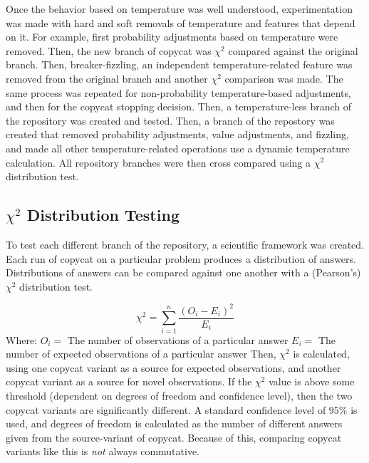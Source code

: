 \documentclass[a4paper]{article}
\begin{document}
        Once the behavior based on temperature was well understood, experimentation was made with hard and soft removals of temperature and features that depend on it.
        For example, first probability adjustments based on temperature were removed.
        Then, the new branch of copycat was $\chi^2$ compared against the original branch.
        Then, breaker-fizzling, an independent temperature-related feature was removed from the original branch and another $\chi^2$ comparison was made.
        The same process was repeated for non-probability temperature-based adjustments, and then for the copycat stopping decision.
        Then, a temperature-less branch of the repository was created and tested.
        Then, a branch of the repostory was created that removed probability adjustments, value adjustments, and fizzling, and made all other temperature-related operations use a dynamic temperature calculation.
        All repository branches were then cross compared using a $\chi^2$ distribution test.

    \subsection{$\chi^2$ Distribution Testing}

        To test each different branch of the repository, a scientific framework was created.
        Each run of copycat on a particular problem produces a distribution of answers.
        Distributions of answers can be compared against one another with a (Pearson's) $\chi^2$ distribution test.

        $$\chi^2 = \sum_{i=1}^{n} \frac{(O_i - E_i)^2}{E_i}$$
        Where:
        \newline
        $O_i = $ The number of observations of a particular answer
        \newline
        $E_i = $ The number of expected observations of a particular answer
        \newline
        Then, $\chi^2$ is calculated, using one copycat variant as a source for expected observations, and another copycat variant as a source for novel observations.
        If the $\chi^2$ value is above some threshold (dependent on degrees of freedom and confidence level), then the two copycat variants are significantly different.
        A standard confidence level of $95\%$ is used, and degrees of freedom is calculated as the number of different answers given from the source-variant of copycat.
        Because of this, comparing copycat variants like this is \emph{not} always commutative.
\end{document}
